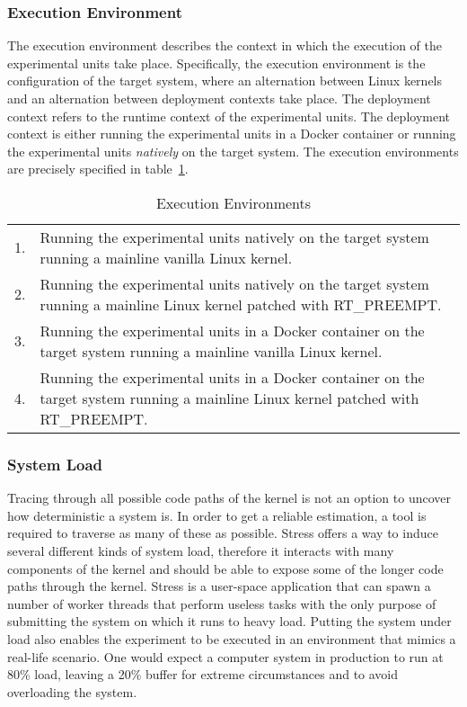\subsubsection{Execution Environment}
The execution environment describes the context in which the execution of the experimental units take place. Specifically, the execution environment is the configuration of the target system, where an alternation between Linux kernels and an alternation between deployment contexts take place. The deployment context refers to the runtime context of the experimental units. The deployment context is either running the experimental units in a Docker container or running the experimental units \textit{natively} on the target system. The execution environments are precisely specified in table~\ref{table:exe-env}.

\begin{table}[ht]
\begin{tabular}{l|p{14cm}}
1. & Running the experimental units natively on the target system running a mainline vanilla Linux kernel.                               \\
2. & Running the experimental units natively on the target system running a mainline Linux kernel patched with RT\_PREEMPT.              \\
3. & Running the experimental units in a Docker container on the target system running a mainline vanilla Linux kernel.                  \\
4. & Running the experimental units in a Docker container on the target system running a mainline Linux kernel patched with RT\_PREEMPT.
\end{tabular}
\centering
\caption{Execution Environments}
\label{table:exe-env}
\end{table}


\subsubsection{System Load}
Tracing through all possible code paths of the kernel is not an option to uncover how deterministic a system is. In order to get a reliable estimation, a tool is required to traverse as many of these as possible. Stress offers a way to induce several different kinds of system load, therefore it interacts with many components of the kernel and should be able to expose some of the longer code paths through the kernel. Stress is a user-space application that can spawn a number of worker threads that perform useless tasks with the only purpose of submitting the system on which it runs to heavy load. Putting the system under load also enables the experiment to be executed in an environment that mimics a real-life scenario. One would expect a computer system in production to run at 80\% load, leaving a 20\% buffer for extreme circumstances and to avoid overloading the system.  


